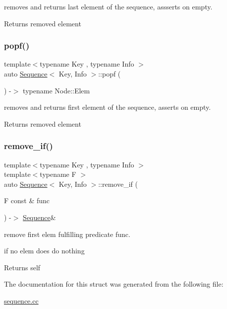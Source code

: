 removes and returns last element of the sequence, assserts on empty. 

\begin{DoxyReturn}{Returns}
removed element 
\end{DoxyReturn}
\mbox{\label{structSequence_ab501278d50dca097b17bc9af8d25f6d4}} 
\subsubsection{\texorpdfstring{popf()}{popf()}}
{\footnotesize\ttfamily template$<$typename Key , typename Info $>$ \\
auto \mbox{\hyperlink{structSequence}{Sequence}}$<$ Key, Info $>$\+::popf (\begin{DoxyParamCaption}{ }\end{DoxyParamCaption}) -\/$>$ typename Node\+::\+Elem \hspace{0.3cm}{\ttfamily [inline]}}



removes and returns first element of the sequence, asserts on empty. 

\begin{DoxyReturn}{Returns}
removed element 
\end{DoxyReturn}
\mbox{\label{structSequence_a8bee122780d6248833649f4b42272f28}} 
\subsubsection{\texorpdfstring{remove\_if()}{remove\_if()}}
{\footnotesize\ttfamily template$<$typename Key , typename Info $>$ \\
template$<$typename F $>$ \\
auto \mbox{\hyperlink{structSequence}{Sequence}}$<$ Key, Info $>$\+::remove\+\_\+if (\begin{DoxyParamCaption}\item[{F const \&}]{func }\end{DoxyParamCaption}) -\/$>$ \mbox{\hyperlink{structSequence}{Sequence}}\& \hspace{0.3cm}{\ttfamily [inline]}}



remove first elem fulfilling predicate func. 

if no elem does do nothing \begin{DoxyReturn}{Returns}
self 
\end{DoxyReturn}


The documentation for this struct was generated from the following file\+:\begin{DoxyCompactItemize}
\item 
\mbox{\hyperlink{sequence_8cc}{sequence.\+cc}}\end{DoxyCompactItemize}
